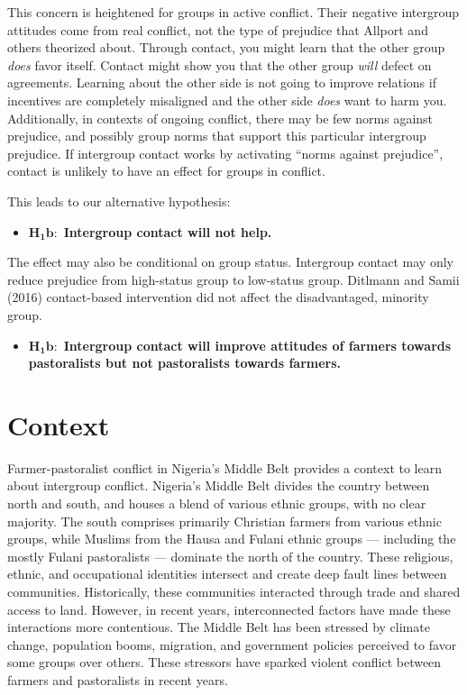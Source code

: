\documentclass[11pt]{article}
\providecommand{\tightlist}{%
  \setlength{\itemsep}{0pt}\setlength{\parskip}{0pt}}
\begin{document}
This concern is heightened for groups in active conflict. Their negative
intergroup attitudes come from real conflict, not the type of prejudice
that Allport and others theorized about. Through contact, you might
learn that the other group \emph{does} favor itself. Contact might show
you that the other group \emph{will} defect on agreements. Learning
about the other side is not going to improve relations if incentives are
completely misaligned and the other side \emph{does} want to harm you.
Additionally, in contexts of ongoing conflict, there may be few norms
against prejudice, and possibly group norms that support this particular
intergroup prejudice. If intergroup contact works by activating ``norms
against prejudice'', contact is unlikely to have an effect for groups in
conflict.

This leads to our alternative hypothesis:

\begin{itemize}
\tightlist
\item
  \(\mathbf{H_1b}:\) \textbf{Intergroup contact will not help.}
\end{itemize}

The effect may also be conditional on group status. Intergroup contact
may only reduce prejudice from high-status group to low-status group.
Ditlmann and Samii (2016) contact-based intervention did not affect the
disadvantaged, minority group.

\begin{itemize}
\tightlist
\item
  \(\mathbf{H_1b}:\) \textbf{Intergroup contact will improve attitudes
  of farmers towards pastoralists but not pastoralists towards farmers.}
\end{itemize}

\hypertarget{context}{%
\section{Context}\label{context}}

Farmer-pastoralist conflict in Nigeria's Middle Belt provides a context
to learn about intergroup conflict. Nigeria's Middle Belt divides the
country between north and south, and houses a blend of various ethnic
groups, with no clear majority. The south comprises primarily Christian
farmers from various ethnic groups, while Muslims from the Hausa and
Fulani ethnic groups --- including the mostly Fulani pastoralists ---
dominate the north of the country. These religious, ethnic, and
occupational identities intersect and create deep fault lines between
communities. Historically, these communities interacted through trade
and shared access to land. However, in recent years, interconnected
factors have made these interactions more contentious. The Middle Belt
has been stressed by climate change, population booms, migration, and
government policies perceived to favor some groups over others. These
stressors have sparked violent conflict between farmers and pastoralists
in recent years.
\end{document}
